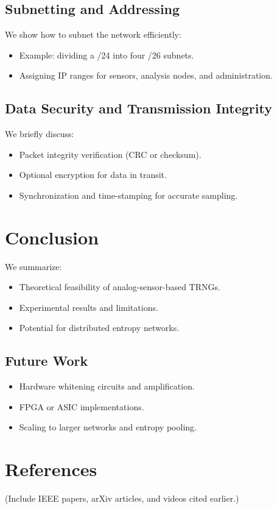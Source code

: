 \subsection{Subnetting and Addressing}
We show how to subnet the network efficiently:
\begin{itemize}
    \item Example: dividing a /24 into four /26 subnets.
    \item Assigning IP ranges for sensors, analysis nodes, and administration.
\end{itemize}

\subsection{Data Security and Transmission Integrity}
We briefly discuss:
\begin{itemize}
    \item Packet integrity verification (CRC or checksum).
    \item Optional encryption for data in transit.
    \item Synchronization and time-stamping for accurate sampling.
\end{itemize}

\newpage
\section{Conclusion}
We summarize:
\begin{itemize}
    \item Theoretical feasibility of analog-sensor-based TRNGs.
    \item Experimental results and limitations.
    \item Potential for distributed entropy networks.
\end{itemize}

\subsection{Future Work}
\begin{itemize}
    \item Hardware whitening circuits and amplification.
    \item FPGA or ASIC implementations.
    \item Scaling to larger networks and entropy pooling.
\end{itemize}

\newpage
\section*{References}
(Include IEEE papers, arXiv articles, and videos cited earlier.)


